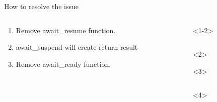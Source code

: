 \documentclass[10pt]{beamer}
\begin{document}
\begin{frame}{How to resolve the issue}

\begin{columns}[T]
\begin{column}{0.3\linewidth}

\begin{enumerate}[<+-| alert@+>]
	\item Remove \alert{await\_resume} function.
	\item \alert{await\_suspend} will create return result
	\item Remove \alert{await\_ready} function.
\end{enumerate}
\end{column}

\begin{column}{0.6\linewidth}
\begin{onlyenv}<1-2>
\inputminted{c++}{code-examples/RVO_examples/transformed_co_await.cpp}
\end{onlyenv}

\begin{onlyenv}<2>
\end{onlyenv}

\begin{onlyenv}<3>
\inputminted{c++}{code-examples/RVO_examples/transformed_co_await_no_ready.cpp}

\end{onlyenv}

\begin{onlyenv}<4>
\inputminted{c++}{code-examples/RVO_examples/transformed_co_await_simplified.cpp}
\end{onlyenv}
\end{column}

\end{columns}

\end{frame}
\end{document}
